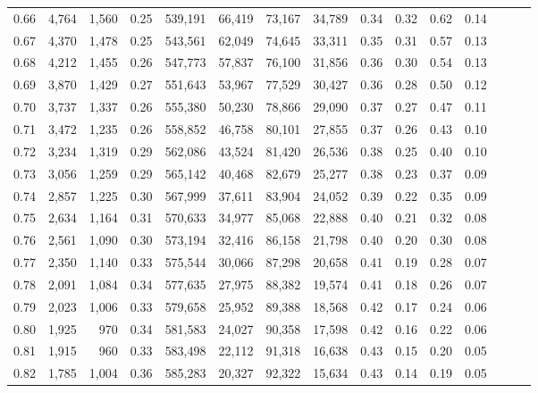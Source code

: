 \begin{tabular}{rrrrrrrrrrrrrrr}
0.66 &   4,764 &  1,560 &  0.25 &  539,191 &   66,419 &   73,167 &   34,789 &  0.34 &  0.32 &  0.62 &      0.14 \\
0.67 &   4,370 &  1,478 &  0.25 &  543,561 &   62,049 &   74,645 &   33,311 &  0.35 &  0.31 &  0.57 &      0.13 \\
0.68 &   4,212 &  1,455 &  0.26 &  547,773 &   57,837 &   76,100 &   31,856 &  0.36 &  0.30 &  0.54 &      0.13 \\
0.69 &   3,870 &  1,429 &  0.27 &  551,643 &   53,967 &   77,529 &   30,427 &  0.36 &  0.28 &  0.50 &      0.12 \\
0.70 &   3,737 &  1,337 &  0.26 &  555,380 &   50,230 &   78,866 &   29,090 &  0.37 &  0.27 &  0.47 &      0.11 \\
0.71 &   3,472 &  1,235 &  0.26 &  558,852 &   46,758 &   80,101 &   27,855 &  0.37 &  0.26 &  0.43 &      0.10 \\
0.72 &   3,234 &  1,319 &  0.29 &  562,086 &   43,524 &   81,420 &   26,536 &  0.38 &  0.25 &  0.40 &      0.10 \\
0.73 &   3,056 &  1,259 &  0.29 &  565,142 &   40,468 &   82,679 &   25,277 &  0.38 &  0.23 &  0.37 &      0.09 \\
0.74 &   2,857 &  1,225 &  0.30 &  567,999 &   37,611 &   83,904 &   24,052 &  0.39 &  0.22 &  0.35 &      0.09 \\
0.75 &   2,634 &  1,164 &  0.31 &  570,633 &   34,977 &   85,068 &   22,888 &  0.40 &  0.21 &  0.32 &      0.08 \\
0.76 &   2,561 &  1,090 &  0.30 &  573,194 &   32,416 &   86,158 &   21,798 &  0.40 &  0.20 &  0.30 &      0.08 \\
0.77 &   2,350 &  1,140 &  0.33 &  575,544 &   30,066 &   87,298 &   20,658 &  0.41 &  0.19 &  0.28 &      0.07 \\
0.78 &   2,091 &  1,084 &  0.34 &  577,635 &   27,975 &   88,382 &   19,574 &  0.41 &  0.18 &  0.26 &      0.07 \\
0.79 &   2,023 &  1,006 &  0.33 &  579,658 &   25,952 &   89,388 &   18,568 &  0.42 &  0.17 &  0.24 &      0.06 \\
0.80 &   1,925 &    970 &  0.34 &  581,583 &   24,027 &   90,358 &   17,598 &  0.42 &  0.16 &  0.22 &      0.06 \\
0.81 &   1,915 &    960 &  0.33 &  583,498 &   22,112 &   91,318 &   16,638 &  0.43 &  0.15 &  0.20 &      0.05 \\
0.82 &   1,785 &  1,004 &  0.36 &  585,283 &   20,327 &   92,322 &   15,634 &  0.43 &  0.14 &  0.19 &      0.05 \\

\end{tabular}
